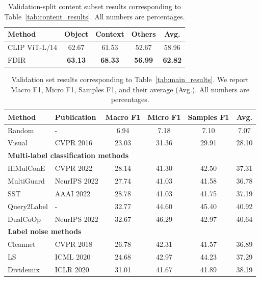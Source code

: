 \begin{table}[H]
\centering
\caption{Validation-split content subset results corresponding to Table~\ref{tab:content_results}. All numbers are percentages.}
\label{tab:content_results_val}
\begin{tabular}{lcccc}
\hline
Method & Object & Context & Others & Avg. \\
\hline
CLIP ViT-L/14 \cite{radford_learning_2021} & 62.67 & 61.53 & 52.67 & 58.96 \\
FDIR & \textbf{63.13} & \textbf{68.33} & \textbf{56.99} & \textbf{62.82} \\
\hline
\end{tabular}
\end{table}

\begin{table}[H]
\centering
\small
\caption{Validation set results corresponding to Table~\ref{tab:main_results}. We report Macro F1, Micro F1, Samples F1, and their average (Avg.). All numbers are percentages.}
\label{tab:main_results_val}
\begingroup
\renewcommand{\arraystretch}{1.0}
\setlength{\tabcolsep}{4pt}
\begin{tabular}{llcccc}
\hline
Method & Publication & Macro F1 & Micro F1 & Samples F1 & Avg. \\
\hline
Random & - & 6.94 & 7.18 & 7.10 & 7.07 \\
Visual \cite{he_deep_2016} & CVPR 2016 & 23.03 & 31.36 & 29.91 & 28.10 \\
\hline
\multicolumn{6}{l}{\textbf{Multi-label classification methods}} \\
HiMulConE \cite{zhang_use_2022} & CVPR 2022 & 28.14 & 41.30 & 42.50 & 37.31 \\
MultiGuard \cite{jia_multiguard_2022} & NeurIPS 2022 & 27.74 & 41.03 & 41.58 & 36.78 \\
SST \cite{chen_structured_2022} & AAAI 2022 & 28.78 & 41.03 & 41.75 & 37.19 \\
Query2Label \cite{liu_query2label_2021} & - & 32.77 & 44.60 & 45.40 & 40.92 \\
DualCoOp \cite{sun_dualcoop_2022} & NeurIPS 2022 & 32.67 & 46.29 & 42.97 & 40.64 \\
\hline
\multicolumn{6}{l}{\textbf{Label noise methods}} \\
Cleannet \cite{lee_cleannet_2018} & CVPR 2018 & 26.78 & 42.31 & 41.57 & 36.89 \\
LS \cite{lukasik_does_2020} & ICML 2020 & 24.68 & 42.97 & 44.23 & 37.29 \\
Dividemix \cite{li_dividemix_2019} & ICLR 2020 & 31.01 & 41.67 & 41.89 & 38.19 \\

\end{tabular}
\end{table}
